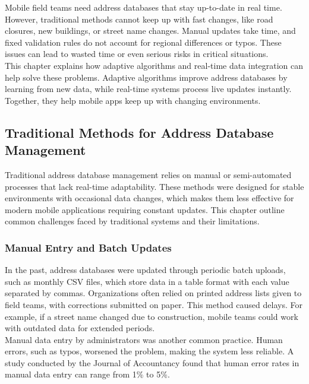 \Author{\daAuthorOne}

Mobile field teams need address databases that stay up-to-date in real time. However, traditional methods cannot keep up with fast changes, like road closures, new buildings, or street name changes. Manual updates take time, and fixed validation rules do not account for regional differences or typos. These issues can lead to wasted time or even serious risks in critical situations.\\

This chapter explains how adaptive algorithms and real-time data integration can help solve these problems. Adaptive algorithms improve address databases by learning from new data, while real-time systems process live updates instantly. Together, they help mobile apps keep up with changing environments.


    \subsection{Traditional Methods for Address Database Management}

    Traditional address database management relies on manual or semi-automated processes that lack real-time adaptability. These methods were designed for stable environments with occasional data changes, which makes them less effective for modern mobile applications requiring constant updates. This chapter outline common challenges faced by traditional systems and their limitations.


        \subsubsection{Manual Entry and Batch Updates}
        In the past, address databases were updated through periodic batch uploads, such as monthly CSV files, which store data in a table format with each value separated by commas. Organizations often relied on printed address lists given to field teams, with corrections submitted on paper. This method caused delays. For example, if a street name changed due to construction, mobile teams could work with outdated data for extended periods. \autocite{FasterCapital2025Mar}\\


        Manual data entry by administrators was another common practice. Human errors, such as typos, worsened the problem, making the system less reliable. A study conducted by the Journal of Accountancy found that human error rates in manual data entry can range from 1\% to 5\%. \autocite{integrationmadeeasy2025Mar}

